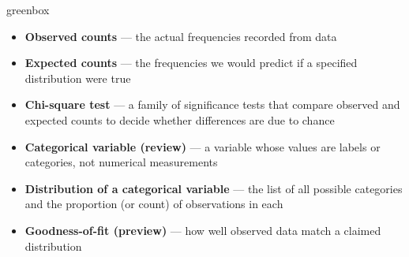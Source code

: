 \documentclass[10pt]{article}
\begin{document}
\begin{skillbox}{greenbox}
\begin{minipage}[t]{0.48\linewidth}
    \begin{itemize}
        \item \textbf{Observed counts} --- the actual frequencies recorded from data
        \item \textbf{Expected counts} --- the frequencies we would predict if a
              specified distribution were true
        \item \textbf{Chi-square test} --- a family of significance tests that compare
              observed and expected counts to decide whether differences are due to chance
    \end{itemize}
\end{minipage}
\hfill
\begin{minipage}[t]{0.48\linewidth}
    \begin{itemize}
        \item \textbf{Categorical variable (review)} --- a variable whose values are
              labels or categories, not numerical measurements
        \item \textbf{Distribution of a categorical variable} --- the list of all
              possible categories and the proportion (or count) of observations in each
        \item \textbf{Goodness-of-fit (preview)} --- how well observed data match a
              claimed distribution
    \end{itemize}
\end{minipage}
\end{skillbox}
\end{document}
